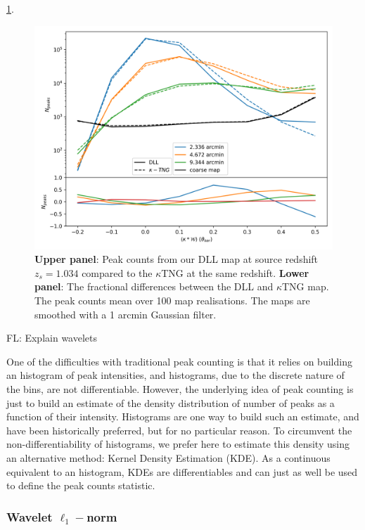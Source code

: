 \documentclass[twocolumn,twocolappendix]{aastex63}
\newcommand{\EiffL}[1]{{\color{cyan}FL: #1}}
\begin{document}
\ref{fig:peakktng_comp1arc}.
\begin{figure}
    \centering
    \includegraphics[width=\columnwidth]{paper/figures/peakktng_comp1arc.png}
    \caption{
      \textbf{Upper panel}: Peak counts from our DLL map at source redshift $z_s=1.034$ compared to the $\kappa$TNG at the same redshift. \textbf{Lower panel}: The fractional differences between the DLL and $\kappa$TNG map.
 The peak counts mean over 100 map realisations. The maps are smoothed with a 1 arcmin Gaussian filter. }
    \label{fig:peakktng_comp1arc}
\end{figure}



\EiffL{Explain wavelets}

One of the difficulties with traditional peak counting is that it relies on building
an histogram of peak intensities, and histograms, due to the discrete nature of the bins, are not differentiable. However, the underlying idea of peak counting is just to build an estimate of the density distribution of number of peaks as a function of their intensity. Histograms are one way to build such an estimate, and have been historically preferred, but for no particular reason. To circumvent the non-differentiability of histograms, we prefer here to estimate this density using an alternative method: Kernel Density Estimation (KDE). As a continuous equivalent to an histogram, KDEs are differentiables and can just as well be used to define the peak counts statistic.

\subsubsection{Wavelet $\ell_1-$norm}
\end{document}
